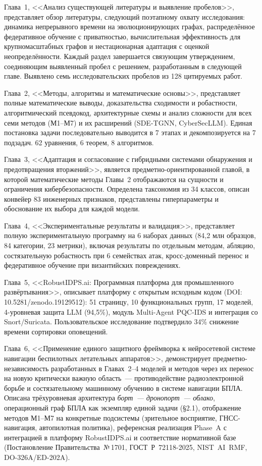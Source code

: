 Глава~1, <<Анализ существующей литературы и выявление пробелов>>, представляет обзор литературы, следующий поэтапному охвату исследования: динамика непрерывного времени на эволюционирующих графах, распределённое федеративное обучение с приватностью, вычислительная эффективность для крупномасштабных графов и нестационарная адаптация с оценкой неопределённости. Каждый раздел завершается связующим утверждением, соединяющим выявленный пробел с решением, разработанным в следующей главе. Выявлено семь исследовательских пробелов из 128 цитируемых работ.

Глава~2, <<Методы, алгоритмы и математические основы>>, представляет полные математические выводы, доказательства сходимости и робастности, алгоритмический псевдокод, архитектурные схемы и анализ сложности для всех семи методов (М1--М7) и их расширений (SDE-TGNN, CyberSecLLM). Единая постановка задачи последовательно выводится в 7 этапах и декомпозируется на 7 подзадач. 62 уравнения, 6 теорем, 8 алгоритмов.

Глава~3, <<Адаптация и согласование с гибридными системами обнаружения и предотвращения вторжений>>, является предметно-ориентированной главой, в которой математические методы Главы~2 отображаются на сущности и ограничения кибербезопасности. Определена таксономия из 34 классов, описан конвейер 83 инженерных признаков, представлены гиперпараметры и обоснование их выбора для каждой модели.

Глава~4, <<Экспериментальные результаты и валидация>>, представляет полную экспериментальную программу на 6 наборах данных (84,2 млн образцов, 84 категории, 23 метрики), включая результаты по отдельным методам, абляцию, состязательную робастность при 6 семействах атак, кросс-доменный перенос и федеративное обучение при византийских повреждениях.

Глава~5, <<RobustIDPS.ai: Программная платформа для промышленного развёртывания>>, описывает платформу с открытым исходным кодом (DOI: 10.5281/zenodo.19129512): 51 страницу, 10 функциональных групп, 17 моделей, 4-уровневая защита LLM (94,5\%), модуль Multi-Agent PQC-IDS и интеграция со Snort/Suricata. Пользовательское исследование подтвердило 34\% снижение времени сортировки оповещений.

Глава~6, <<Применение единого защитного фреймворка к нейросетевой системе навигации беспилотных летательных аппаратов>>, демонстрирует предметно-независимость разработанных в Главах~2--4 моделей и методов через их перенос на новую критически важную область~--- противодействие радиоэлектронной борьбе и состязательному машинному обучению в системе навигации БПЛА. Описана трёхуровневая архитектура \emph{борт~--- дронопорт~--- облако}, операционный граф БПЛА как экземпляр единой задачи (\S2.1), отображение методов \textsf{М1}--\textsf{М7} на конкретные подсистемы (зрительное восприятие, ГНСС-навигация, автопилотная политика), референсная реализация Phase~A с интеграцией в платформу \textsf{RobustIDPS.ai} и соответствие нормативной базе (Постановление Правительства~№\,1701, \mbox{ГОСТ~Р~72118-2025}, \mbox{NIST~AI~RMF}, \mbox{DO-326A/ED-202A}).

